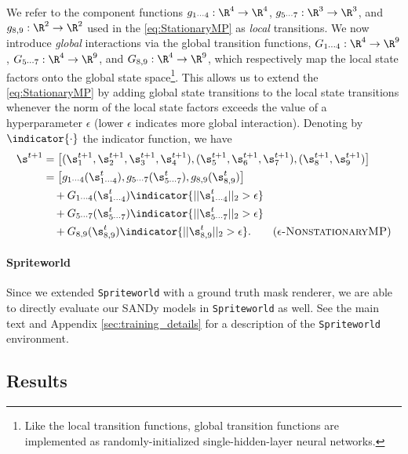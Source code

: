 \documentclass[coda.tex]{subfiles}
\begin{document}
We refer to the component functions ${g_{1\cdots4}: \R^4 \rightarrow \R^4}$, ${g_{5\cdots7}: \R^3 \rightarrow \R^3}$, and ${g_{8,9}: \R^2 \rightarrow \R^2}$ used in the \ref{eq:StationaryMP} as \emph{local} transitions.
We now introduce \emph{global} interactions via the global transition functions, ${G_{1\cdots4}: \R^4 \rightarrow \R^9}$, ${G_{5\cdots7}: \R^4 \rightarrow \R^9}$, and ${G_{8, 9}: \R^4 \rightarrow \R^9}$, which respectively map the local state factors onto the global state space\footnote{
Like the local transition functions, global transition functions are implemented as randomly-initialized single-hidden-layer neural networks.
}.
This allows us to extend the \ref{eq:StationaryMP} by adding global state transitions to the local state transitions whenever the norm of the local state factors exceeds the value of a hyperparameter $\epsilon$ (lower $\epsilon$ indicates more global interaction).
Denoting by $\indicator{\cdot}$ the indicator function, we have
\begin{align*}\label{eq:NonstationaryMP}
\s^{t+1} &= \left[(\s_1^{t+1}, \s_2^{t+1}, \s_3^{t+1}, \s_4^{t+1}), (\s_5^{t+1}, \s_6^{t+1}, \s_7^{t+1}), (\s_8^{t+1}, \s_9^{t+1}) \right]\\
&= \left[g_{1\cdots4}(\s_{1\cdots4}^{t}),  g_{5\cdots7}(\s_{5\cdots7}^{t}),  g_{8,9}(\s_{8,9}^{t})\right]\\
  &\quad + G_{1\cdots4}(\s_{1\cdots4}^{t}){\indicator{||\s_{1\cdots4}^{t}||_2 > \epsilon}} \nonumber \\
  &\quad + G_{5\cdots7}(\s_{5\cdots7}^{t}){\indicator{||\s_{5\cdots7}^{t}||_2 > \epsilon}} \nonumber \\  
  &\quad + G_{8,9}(\s_{8,9}^{t}){\indicator{||\s_{8,9}^{t}||_2 > \epsilon}}.
  \tag{\textsc{$\epsilon$-NonstationaryMP}}
\end{align*}

\paragraph{Spriteworld}

Since we extended \texttt{Spriteworld} with a ground truth mask renderer, we are able to directly evaluate our SANDy models in \texttt{Spriteworld} as well. See the main text and Appendix \ref{sec:training_details} for a description of the \texttt{Spriteworld} environment. 

\subsection{Results}\label{sec:mask_results}
\end{document}

